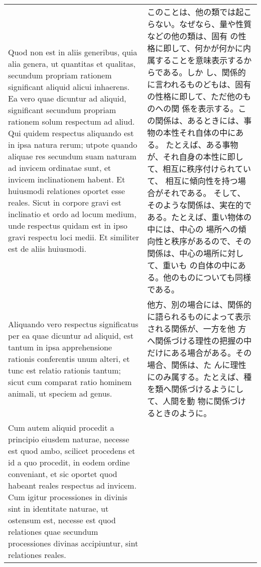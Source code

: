 \documentclass[10pt]{jsarticle} %
\begin{document}
\begin{longtable}{p{21em}p{21em}}
\\

Quod non est in aliis generibus, quia alia genera, ut quantitas et
qualitas, secundum propriam rationem significant aliquid alicui
inhaerens. Ea vero quae dicuntur ad aliquid, significant secundum
propriam rationem solum respectum ad aliud. Qui quidem respectus
aliquando est in ipsa natura rerum; utpote quando aliquae res secundum
suam naturam ad invicem ordinatae sunt, et invicem inclinationem
habent. 
Et huiusmodi relationes oportet esse reales. Sicut in corpore
gravi est inclinatio et ordo ad locum medium, unde respectus quidam est
in ipso gravi respectu loci medii. Et similiter est de aliis
huiusmodi. 


&

このことは、他の類では起こらない。なぜなら、量や性質などの他の類は、固有
 の性格に即して、何かが何かに内属することを意味表示するからである。しか
 し、関係的に言われるものどもは、固有の性格に即して、ただ他のものへの関
 係を表示する。この関係は、あるときには、事物の本性それ自体の中にある。
 たとえば、ある事物が、それ自身の本性に即して、相互に秩序付けられていて、
 相互に傾向性を持つ場合がそれである。
そして、そのような関係は、実在的である。たとえば、重い物体の中には、中心の
 場所への傾向性と秩序があるので、その関係は、中心の場所に対して、重いも
 の自体の中にある。他のものについても同様である。

\\

Aliquando vero respectus significatus per ea quae dicuntur ad
aliquid, est tantum in ipsa apprehensione rationis conferentis unum
alteri, et tunc est relatio rationis tantum; sicut cum comparat ratio
hominem animali, ut speciem ad genus. 

&


他方、別の場合には、関係的に語られるものによって表示される関係が、一方を他
 方へ関係づける理性の把握の中だけにある場合がある。その場合、関係は、た
 んに理性にのみ属する。たとえば、種を類へ関係づけるようにして、人間を動
 物に関係づけるときのように。

\\


Cum autem aliquid procedit a
principio eiusdem naturae, necesse est quod ambo, scilicet procedens et
id a quo procedit, in eodem ordine conveniant, et sic oportet quod
habeant reales respectus ad invicem. Cum igitur processiones in divinis
sint in identitate naturae, ut ostensum est, necesse est quod relationes
quae secundum processiones divinas accipiuntur, sint relationes reales.


\end{longtable}
\end{document}
